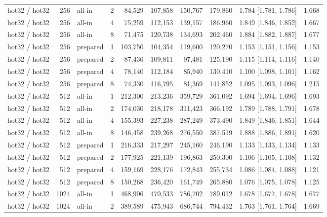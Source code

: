 \begin{table}[t]
{\begin{tabular}{lrlrrrrrlr}
hot32 / hot32 & 256 & all-in & 2 & 84{,}529 & 107{,}858 & 150{,}767 & 179{,}860 & 1.784 [1.781, 1.786] & 1.668 \\
hot32 / hot32 & 256 & all-in & 4 & 75{,}259 & 112{,}153 & 139{,}157 & 186{,}960 & 1.849 [1.846, 1.852] & 1.667 \\
hot32 / hot32 & 256 & all-in & 8 & 71{,}475 & 120{,}738 & 134{,}693 & 202{,}460 & 1.884 [1.882, 1.887] & 1.677 \\
hot32 / hot32 & 256 & prepared & 1 & 103{,}750 & 104{,}354 & 119{,}600 & 120{,}270 & 1.153 [1.151, 1.156] & 1.153 \\
hot32 / hot32 & 256 & prepared & 2 & 87{,}436 & 109{,}811 & 97{,}481 & 125{,}190 & 1.115 [1.114, 1.116] & 1.140 \\
hot32 / hot32 & 256 & prepared & 4 & 78{,}140 & 112{,}184 & 85{,}940 & 130{,}410 & 1.100 [1.098, 1.101] & 1.162 \\
hot32 / hot32 & 256 & prepared & 8 & 74{,}330 & 116{,}795 & 81{,}369 & 141{,}852 & 1.095 [1.093, 1.096] & 1.215 \\
hot32 / hot32 & 512 & all-in & 1 & 212{,}300 & 213{,}236 & 359{,}729 & 361{,}092 & 1.694 [1.694, 1.696] & 1.693 \\
hot32 / hot32 & 512 & all-in & 2 & 174{,}030 & 218{,}178 & 311{,}423 & 366{,}192 & 1.789 [1.788, 1.791] & 1.678 \\
hot32 / hot32 & 512 & all-in & 4 & 155{,}393 & 227{,}238 & 287{,}249 & 373{,}490 & 1.849 [1.846, 1.851] & 1.644 \\
hot32 / hot32 & 512 & all-in & 8 & 146{,}458 & 239{,}268 & 276{,}550 & 387{,}519 & 1.888 [1.886, 1.891] & 1.620 \\
hot32 / hot32 & 512 & prepared & 1 & 216{,}333 & 217{,}297 & 245{,}160 & 246{,}190 & 1.133 [1.133, 1.134] & 1.133 \\
hot32 / hot32 & 512 & prepared & 2 & 177{,}925 & 221{,}139 & 196{,}863 & 250{,}300 & 1.106 [1.105, 1.108] & 1.132 \\
hot32 / hot32 & 512 & prepared & 4 & 159{,}169 & 228{,}176 & 172{,}843 & 255{,}734 & 1.086 [1.084, 1.088] & 1.121 \\
hot32 / hot32 & 512 & prepared & 8 & 150{,}268 & 236{,}420 & 161{,}749 & 265{,}880 & 1.076 [1.075, 1.078] & 1.125 \\
hot32 / hot32 & 1024 & all-in & 1 & 468{,}906 & 470{,}533 & 786{,}702 & 789{,}012 & 1.678 [1.677, 1.678] & 1.677 \\
hot32 / hot32 & 1024 & all-in & 2 & 389{,}589 & 475{,}943 & 686{,}744 & 794{,}432 & 1.763 [1.761, 1.764] & 1.669 \\

\end{tabular}}
\end{table}
